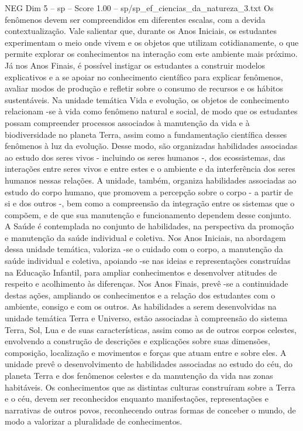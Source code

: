 \begin{textsample}{NEG Dim 5 – sp – Score 1.00 – sp/sp\_ef\_ciencias\_da\_natureza\_3.txt}
Os fenômenos devem ser compreendidos em diferentes escalas, com a devida contextualização.
Vale salientar que, durante os Anos Iniciais, os estudantes experimentam o meio onde vivem e os objetos que utilizam cotidianamente, o que permite explorar os conhecimentos na interação com este ambiente mais próximo.
Já nos Anos Finais, é possível instigar os estudantes a construir modelos explicativos e a se apoiar no conhecimento científico para explicar fenômenos, avaliar modos de produção e refletir sobre o consumo de recursos e os hábitos sustentáveis.
Na unidade temática Vida e evolução, os objetos de conhecimento relacionam -se à vida como fenômeno natural e social, de modo que os estudantes possam compreender processos associados à manutenção da vida e à biodiversidade no planeta Terra, assim como a fundamentação científica desses fenômenos à luz da evolução.
Desse modo, são organizadas habilidades associadas ao estudo dos seres vivos - incluindo os seres humanos -, dos ecossistemas, das interações entre seres vivos e entre estes e o ambiente e da interferência dos seres humanos nessas relações.
A unidade, também, organiza habilidades associadas ao estudo do corpo humano, que promovem a percepção sobre o corpo - a partir de si e dos outros -, bem como a compreensão da integração entre os sistemas que o compõem, e de que sua manutenção e funcionamento dependem desse conjunto.
A Saúde é contemplada no conjunto de habilidades, na perspectiva da promoção e manutenção da saúde individual e coletiva.
Nos Anos Iniciais, na abordagem dessa unidade temática, valoriza -se o cuidado com o corpo, a manutenção da saúde individual e coletiva, apoiando -se nas ideias e representações construídas na Educação Infantil, para ampliar conhecimentos e desenvolver atitudes de respeito e acolhimento às diferenças.
Nos Anos Finais, prevê -se a continuidade destas ações, ampliando os conhecimentos e a relação dos estudantes com o ambiente, consigo e com os outros.
As habilidades a serem desenvolvidas na unidade temática Terra e Universo, estão associadas à compreensão do sistema Terra, Sol, Lua e de suas características, assim como as de outros corpos celestes, envolvendo a construção de descrições e explicações sobre suas dimensões, composição, localização e movimentos e forças que atuam entre e sobre eles.
A unidade prevê o desenvolvimento de habilidades associadas ao estudo do céu, do planeta Terra e dos fenômenos celestes e da manutenção da vida nas zonas habitáveis.
Os conhecimentos que as distintas culturas construíram sobre a Terra e o céu, devem ser reconhecidos enquanto manifestações, representações e narrativas de outros povos, reconhecendo outras formas de conceber o mundo, de modo a valorizar a pluralidade de conhecimentos.

\end{textsample}
